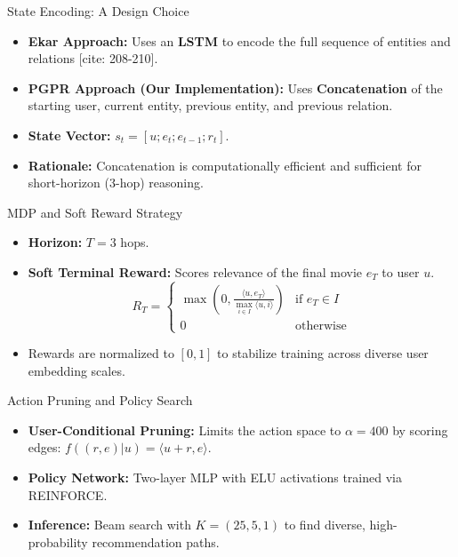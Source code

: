 \documentclass[10pt]{beamer}
\begin{document}
\begin{frame}{State Encoding: A Design Choice}
    \begin{itemize}
        \item \textbf{Ekar Approach:} Uses an \textbf{LSTM} to encode the full sequence of entities and relations [cite: 208-210].
        \item \textbf{PGPR Approach (Our Implementation):} Uses \textbf{Concatenation} of the starting user, current entity, previous entity, and previous relation.
        \item \textbf{State Vector:} $s_t = [u; e_t; e_{t-1}; r_t]$.
        \item \textbf{Rationale:} Concatenation is computationally efficient and sufficient for short-horizon (3-hop) reasoning.
    \end{itemize}
\end{frame}

\begin{frame}{MDP and Soft Reward Strategy}
    \begin{itemize}
        \item \textbf{Horizon:} $T=3$ hops.
        \item \textbf{Soft Terminal Reward:} Scores relevance of the final movie $e_T$ to user $u$.
        \[ R_T = \begin{cases} \max(0, \frac{\langle u, e_T \rangle}{\max_{i \in I} \langle u, i \rangle}) & \text{if } e_T \in I \\ 0 & \text{otherwise} \end{cases} \] 
        \item Rewards are normalized to $[0, 1]$ to stabilize training across diverse user embedding scales.
    \end{itemize}
\end{frame}

\begin{frame}{Action Pruning and Policy Search}
    \begin{itemize}
        \item \textbf{User-Conditional Pruning:} Limits the action space to $\alpha = 400$ by scoring edges: $f((r, e)|u) = \langle u+r, e \rangle$.
        \item \textbf{Policy Network:} Two-layer MLP with ELU activations trained via REINFORCE.
        \item \textbf{Inference:} Beam search with $K=(25, 5, 1)$ to find diverse, high-probability recommendation paths.
    \end{itemize}
\end{frame}
\end{document}
